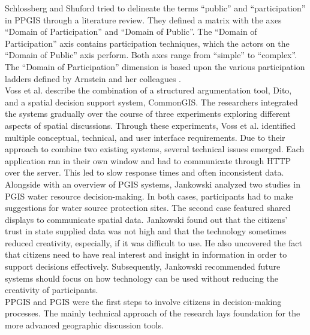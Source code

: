 Schlossberg and Shuford \cite{Schlossberg2005_PPGIS} tried to delineate the terms ``public'' and ``participation'' in PPGIS through a literature review. They defined a matrix with the axes ``Domain of Participation'' and ``Domain of Public''. The ``Domain of Participation'' axis contains participation techniques, which the actors on the ``Domain of Public'' axis perform. Both axes range from ``simple'' to ``complex''. The ``Domain of Participation'' dimension is based upon the various participation ladders defined by Arnstein and her colleagues \cite{Arnstein1969_citizen_participation,Wiedemann1993355,Connor1988_new_ladder}.\\
Voss et al. \cite{Voss2004_Evolution_PGIS} describe the combination of a structured argumentation tool, Dito, and a spatial decision support system, CommonGIS. The researchers integrated the systems gradually over the course of three experiments exploring different aspects of spatial discussions. Through these experiments, Voss et al. identified multiple conceptual, technical, and user interface requirements. Due to their approach to combine two existing systems, several technical issues emerged. Each application ran in their own window and had to communicate through HTTP over the server. This led to slow response times and often inconsistent data.\\
Alongside with an overview of PGIS systems, Jankowski \cite{Jankowski2005_community_based_pgis} analyzed two studies in PGIS water resource decision-making. In both cases, participants had to make suggestions for water source protection sites. The second case featured shared displays to communicate spatial data. Jankowski found out that the citizens' trust in state supplied data was not high and that the technology sometimes reduced creativity, especially, if it was difficult to use. He also uncovered the fact that citizens need to have real interest and insight in information in order to support decisions effectively. Subsequently, Jankowski recommended future systems should focus on how technology can be used without reducing the creativity of participants.\\
PPGIS and PGIS were the first steps to involve citizens in decision-making processes. The mainly technical approach of the research lays foundation for the more advanced geographic discussion tools.

